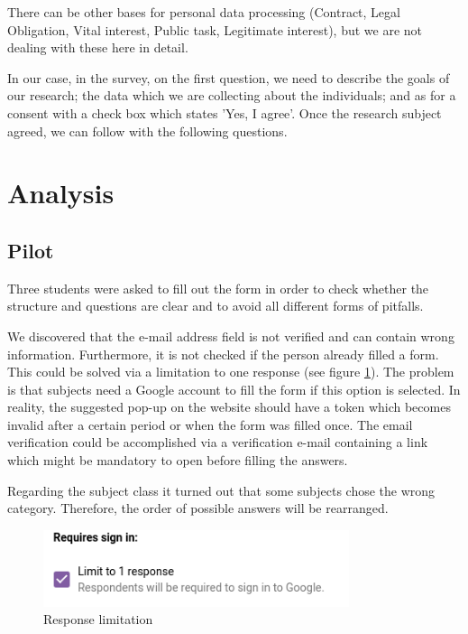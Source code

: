 \documentclass[12pt,a4paper,paper=a4,oneside,titlepage,pdftex]{scrartcl}
\begin{document}
There can be other bases for personal data processing (Contract, Legal Obligation, Vital interest, Public task, Legitimate interest), but we are not dealing with these here in detail.

In our case, in the survey, on the first question, we need to describe the goals of our research; the data which we are collecting about the individuals; and as for a consent with a check box which states 'Yes, I agree'. Once the research subject agreed, we can follow with the following questions.

\section{Analysis}

\subsection{Pilot}
Three students were asked to fill out the form in order to check whether the structure and questions are clear and to avoid all different forms of pitfalls. 

We discovered that the e-mail address field is not verified and can contain wrong information. Furthermore, it is not checked if the person already filled a form. This could be solved via a limitation to one response (see figure \ref{fig:response-limit}). The problem is that subjects need a Google account to fill the form if this option is selected. In reality, the suggested pop-up on the website should have a token which becomes invalid after a certain period or when the form was filled once. The email verification could be accomplished via a verification  e-mail containing a link which might be mandatory to open before filling the answers.

Regarding the subject class it turned out that some subjects chose the wrong category. Therefore, the order of possible answers will be rearranged.

\begin{figure}[h!]
    \centering
    \includegraphics[width=0.8\textwidth]{figures/response-limitation.png}
    \caption{Response limitation}
    \label{fig:response-limit}
\end{figure}
\end{document}
